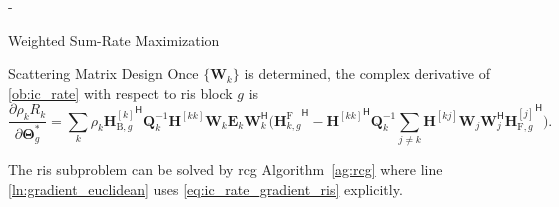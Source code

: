 \begin{section}{-}
\begin{subsection}{Weighted Sum-Rate Maximization}
		\begin{subsubsection}{Scattering Matrix Design}
			Once $\{\mathbf{W}_k\}$ is determined, the complex derivative of \eqref{ob:ic_rate} with respect to \gls{ris} block $g$ is
			\begin{equation}
				\frac{\partial \rho_k R_k}{\partial \mathbf{\Theta}_g^*} = \sum_k \rho_k {\mathbf{H}^{[k]}_{\mathrm{B},g}}^\mathsf{H} \mathbf{Q}_k^{-1} {\mathbf{H}^{[kk]}} \mathbf{W}_k \mathbf{E}_k \mathbf{W}_k^\mathsf{H} \bigl({\mathbf{H}_{k,g}^\mathrm{F}}^\mathsf{H} - {\mathbf{H}^{[kk]}}^\mathsf{H} \mathbf{Q}_k^{-1} \sum_{j \ne k} {\mathbf{H}^{[kj]}} \mathbf{W}_j \mathbf{W}_j^\mathsf{H} {\mathbf{H}^{[j]}_{\mathrm{F},g}}^\mathsf{H}\bigr).
				\label{eq:ic_rate_gradient_ris}
			\end{equation}
		\end{subsubsection}
		The \gls{ris} subproblem can be solved by \gls{rcg} Algorithm~\ref{ag:rcg} where line \ref{ln:gradient_euclidean} uses \eqref{eq:ic_rate_gradient_ris} explicitly.
	\end{subsection}
\end{section}


